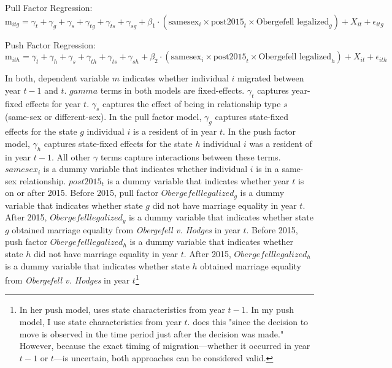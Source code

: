 \documentclass[12pt,letterpaper]{article}
\begin{document}
\hfill
\break
Pull Factor Regression:
\begin{equation}
\text{m}_{itg} = \gamma_t + \gamma_g + \gamma_s + \gamma_{tg} + \gamma_{ts} + \gamma_{sg} + \beta_1 \cdot (\text{samesex}_i \times \text{post2015}_t \times \text{Obergefell legalized}_g) 
+ X_{it} + \epsilon_{itg}
\end{equation}

\hfill
\break
Push Factor Regression:
\begin{equation}
\text{m}_{ith} = \gamma_t + \gamma_h + \gamma_s + \gamma_{th} + \gamma_{ts} + \gamma_{sh} + \beta_2 \cdot (\text{samesex}_i \times \text{post2015}_t \times \text{Obergefell legalized}_h) 
+ X_{it} + \epsilon_{ith}
\end{equation}

In both, dependent variable $m$ indicates whether individual $i$ migrated between year $t-1$ and $t$. $gamma$ terms in both models are fixed-effects. $\gamma_t$ captures year-fixed effects for year $t$. $\gamma_s$ captures the effect of being in relationship type $s$ (same-sex or different-sex). In the pull factor model, $\gamma_g$ captures state-fixed effects for the state $g$ individual $i$ is a resident of in year $t$. In the push factor model, $\gamma_h$ captures state-fixed effects for the state $h$ individual $i$ was a resident of in year $t-1$. All other $\gamma$ terms capture interactions between these terms. $samesex_i$ is a dummy variable that indicates whether individual $i$ is in a same-sex relationship. $post2015_t$ is a dummy variable that indicates whether year $t$ is on or after 2015. Before 2015, pull factor $Obergefell legalized_g$ is a dummy variable that indicates whether state $g$ did not have marriage equality in year $t$. After 2015, $Obergefell legalized_g$ is a dummy variable that indicates whether state $g$ obtained marriage equality from \textit{Obergefell v. Hodges} in year $t$. Before 2015, push factor $Obergefell legalized_h$ is a dummy variable that indicates whether state $h$ did not have marriage equality in year $t$. After 2015, $Obergefell legalized_h$ is a dummy variable that indicates whether state $h$ obtained marriage equality from \textit{Obergefell v. Hodges} in year $t$\footnote{In her push model, \citet{12} uses state characteristics from year $t-1$. In my push model, I use state characteristics from year $t$. \citet{12} does this "since the decision to move is observed in the time
period just after the decision was made." However, because the exact timing of migration—whether it occurred in year $t-1$ or $t$—is uncertain, both approaches can be considered valid.}
\end{document}
